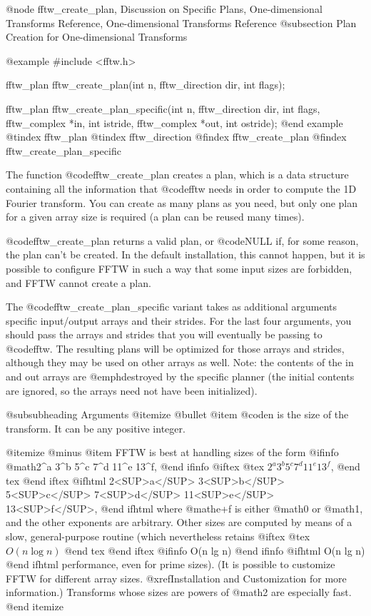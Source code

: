 @node    fftw_create_plan, Discussion on Specific Plans, One-dimensional Transforms Reference, One-dimensional Transforms Reference
@subsection Plan Creation for One-dimensional Transforms

@example
#include <fftw.h>

fftw_plan fftw_create_plan(int n, fftw_direction dir,
                           int flags);

fftw_plan fftw_create_plan_specific(int n, fftw_direction dir,
                                    int flags,
                                    fftw_complex *in, int istride,
                                    fftw_complex *out, int ostride);
@end example
@tindex fftw_plan
@tindex fftw_direction
@findex fftw_create_plan
@findex fftw_create_plan_specific

The function @code{fftw_create_plan} creates a plan, which is
a data structure containing all the information that @code{fftw}
needs in order to compute the 1D Fourier transform. You can
create as many plans as you need, but only one plan for a given
array size is required (a plan can be reused many times).

@code{fftw_create_plan} returns a valid plan, or @code{NULL}
if, for some reason, the plan can't be created.  In the
default installation, this cannot happen, but it is possible
to configure FFTW in such a way that some input sizes are
forbidden, and FFTW cannot create a plan.

The @code{fftw_create_plan_specific} variant takes as additional
arguments specific input/output arrays and their strides.  For the last
four arguments, you should pass the arrays and strides that you will
eventually be passing to @code{fftw}.  The resulting plans will be
optimized for those arrays and strides, although they may be used on
other arrays as well.  Note: the contents of the in and out arrays are
@emph{destroyed} by the specific planner (the initial contents are
ignored, so the arrays need not have been initialized).

@subsubheading Arguments
@itemize @bullet
@item
@code{n} is the size of the transform.  It can be
 any positive integer.
 
@itemize @minus
@item
FFTW is best at handling sizes of the form
@ifinfo
@math{2^a 3^b 5^c 7^d 11^e 13^f},
@end ifinfo
@iftex
@tex
$2^a 3^b 5^c 7^d 11^e 13^f$,
@end tex
@end iftex
@ifhtml
2<SUP>a</SUP> 3<SUP>b</SUP> 5<SUP>c</SUP> 7<SUP>d</SUP>
        11<SUP>e</SUP> 13<SUP>f</SUP>,
@end ifhtml
where @math{e+f} is either @math{0} or
@math{1}, and the other exponents are arbitrary.  Other sizes are
computed by means of a slow, general-purpose routine (which nevertheless
retains 
@iftex
@tex
$O(n \log n)$
@end tex
@end iftex
@ifinfo
O(n lg n)
@end ifinfo
@ifhtml
O(n lg n)
@end ifhtml
performance, even for prime sizes).  (It is
possible to customize FFTW for different array sizes.
@xref{Installation and Customization} for more information.)  Transforms
whose sizes are powers of @math{2} are especially fast.
@end itemize

